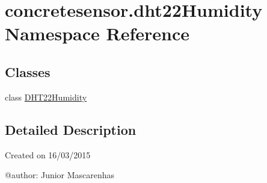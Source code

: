 \hypertarget{namespaceconcretesensor_1_1dht22Humidity}{}\section{concretesensor.\+dht22\+Humidity Namespace Reference}
\label{namespaceconcretesensor_1_1dht22Humidity}
\subsection*{Classes}
\begin{DoxyCompactItemize}
\item 
class \hyperlink{classconcretesensor_1_1dht22Humidity_1_1DHT22Humidity}{D\+H\+T22\+Humidity}
\end{DoxyCompactItemize}


\subsection{Detailed Description}
\begin{DoxyVerb}Created on 16/03/2015

@author: Junior Mascarenhas
\end{DoxyVerb}
 